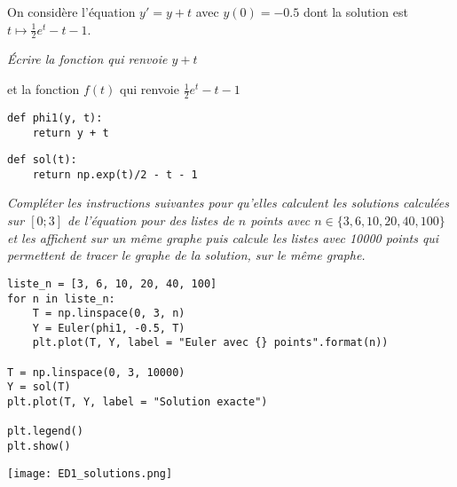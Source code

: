 On considère l'équation $y' = y+t$ avec $y(0) = -0.5$ dont la solution est $t\mapsto \frac 12 e^t - t - 1$.
\begin{Exercise}\it
Écrire la fonction  qui renvoie $y+t$ 

et la fonction $f(t)$ qui renvoie $\frac 12 e^t - t - 1$
\end{Exercise}
\begin{Answer}
\begin{lstlisting}
def phi1(y, t):
    return y + t
\end{lstlisting}

\begin{lstlisting}
def sol(t):
    return np.exp(t)/2 - t - 1
\end{lstlisting}
\end{Answer}
\newpage
\begin{Exercise}\it
Compléter les instructions suivantes pour qu'elles calculent les solutions calculées sur $[0;3]$ de l'équation pour des listes de $n$ points avec $n\in\{3, 6, 10, 20, 40, 100\}$ et les affichent sur un même graphe puis calcule les listes avec 10000 points qui permettent de tracer le graphe de la solution, sur le même graphe. 
\end{Exercise}
\begin{Answer}
\begin{lstlisting}
liste_n = [3, 6, 10, 20, 40, 100]
for n in liste_n:
    T = np.linspace(0, 3, n)
    Y = Euler(phi1, -0.5, T)
    plt.plot(T, Y, label = "Euler avec {} points".format(n))
    
T = np.linspace(0, 3, 10000)
Y = sol(T)
plt.plot(T, Y, label = "Solution exacte")

plt.legend()
plt.show()
\end{lstlisting}
\begin{center}
\texttt{[image: ED1\_solutions.png]}
\end{center}
\end{Answer}

